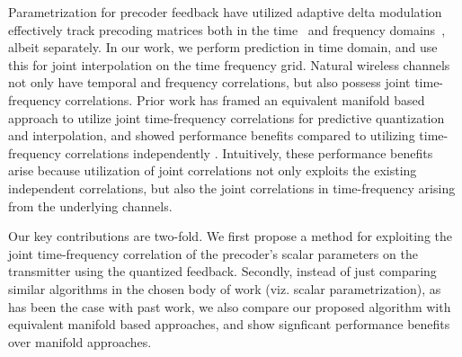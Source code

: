 \documentclass[journal,10pt,twocolumn]{IEEEtran}
\begin{document}
Parametrization for precoder feedback have utilized adaptive delta
modulation effectively track precoding matrices both in the
time~\cite{4114278} and frequency domains~\cite{4556174}, albeit
separately. In our work, we perform prediction in time domain, and use
this for joint interpolation on the time frequency grid. Natural
wireless channels not only have temporal and frequency correlations,
but also possess joint time-frequency correlations.  Prior work
\cite{Gupt1905:Predictive} has framed an equivalent manifold based
approach to utilize joint time-frequency correlations for predictive
quantization and interpolation, and showed performance benefits
compared to utilizing time-frequency correlations independently
\cite{6891198,khaled2005quantized}.  Intuitively, these performance
benefits arise because utilization of joint correlations not only
exploits the existing independent correlations, but also the joint
correlations in time-frequency arising from the underlying channels.

Our key contributions are two-fold.  We first propose a method for exploiting the
joint time-frequency correlation of the precoder's scalar parameters
on the transmitter using the quantized feedback.
Secondly, instead of just comparing similar algorithms in the chosen body of work (viz. scalar parametrization), as has been the case with past work, we also compare our proposed algorithm with equivalent manifold based approaches, and show signficant performance benefits over manifold approaches.


\end{document}
